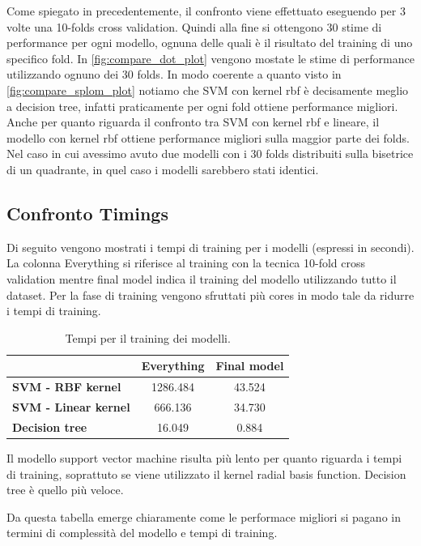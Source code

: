 Come spiegato in precedentemente, il confronto viene effettuato eseguendo per 3 volte una 10-folds cross validation. Quindi alla fine si ottengono 30 stime di performance per ogni modello, ognuna delle quali è il risultato del training di uno specifico fold. In \autoref{fig:compare_dot_plot} vengono mostate le stime di performance utilizzando ognuno dei 30 folds. In modo coerente a quanto visto in \autoref{fig:compare_splom_plot} notiamo che SVM con kernel rbf è decisamente meglio a decision tree, infatti praticamente per ogni fold ottiene performance migliori. Anche per quanto riguarda il confronto tra SVM con kernel rbf e lineare, il modello con kernel rbf ottiene performance migliori sulla maggior parte dei folds. Nel caso in cui avessimo avuto due modelli con i 30 folds distribuiti sulla bisetrice di un quadrante, in quel caso i modelli sarebbero stati identici.

\subsection{Confronto Timings}
Di seguito vengono mostrati i tempi di training per i modelli (espressi in secondi).
La colonna
Everything si riferisce al training con la tecnica 10-fold cross
validation mentre final model indica il training del modello
utilizzando tutto il dataset. Per la fase di training vengono
sfruttati più cores in modo tale da ridurre i tempi di training.

\begin{table}[H]
	\begin{center}
		\begin{tabular}{ | l | c | c |}
			\hline
			& \textbf{Everything} & \textbf{Final model} \\
			\hline
			\textbf{SVM - RBF kernel} & 1286.484  & 43.524 \\
			\textbf{SVM - Linear kernel} & 666.136 & 34.730 \\
			\textbf{Decision tree} & 16.049 & 0.884  \\
			\hline
		\end{tabular}
	\end{center}
	\caption{Tempi per il training dei modelli.}
\end{table}

Il modello support vector machine
risulta più lento per quanto riguarda i tempi di training, soprattuto
se viene utilizzato il kernel radial basis function. Decision tree è
quello più veloce.

Da questa tabella emerge chiaramente come le performace migliori si pagano in termini di complessità del modello e tempi di training.
